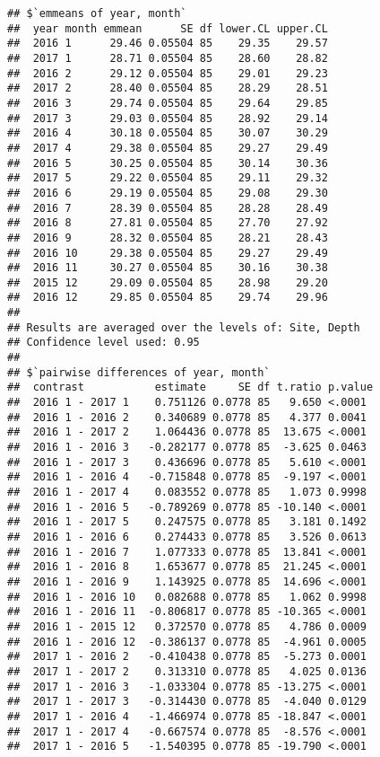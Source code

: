 \documentclass[
]{article}
\begin{document}
\begin{verbatim}
## $`emmeans of year, month`
##  year month emmean      SE df lower.CL upper.CL
##  2016 1      29.46 0.05504 85    29.35    29.57
##  2017 1      28.71 0.05504 85    28.60    28.82
##  2016 2      29.12 0.05504 85    29.01    29.23
##  2017 2      28.40 0.05504 85    28.29    28.51
##  2016 3      29.74 0.05504 85    29.64    29.85
##  2017 3      29.03 0.05504 85    28.92    29.14
##  2016 4      30.18 0.05504 85    30.07    30.29
##  2017 4      29.38 0.05504 85    29.27    29.49
##  2016 5      30.25 0.05504 85    30.14    30.36
##  2017 5      29.22 0.05504 85    29.11    29.32
##  2016 6      29.19 0.05504 85    29.08    29.30
##  2016 7      28.39 0.05504 85    28.28    28.49
##  2016 8      27.81 0.05504 85    27.70    27.92
##  2016 9      28.32 0.05504 85    28.21    28.43
##  2016 10     29.38 0.05504 85    29.27    29.49
##  2016 11     30.27 0.05504 85    30.16    30.38
##  2015 12     29.09 0.05504 85    28.98    29.20
##  2016 12     29.85 0.05504 85    29.74    29.96
## 
## Results are averaged over the levels of: Site, Depth 
## Confidence level used: 0.95 
## 
## $`pairwise differences of year, month`
##  contrast           estimate     SE df t.ratio p.value
##  2016 1 - 2017 1    0.751126 0.0778 85   9.650 <.0001 
##  2016 1 - 2016 2    0.340689 0.0778 85   4.377 0.0041 
##  2016 1 - 2017 2    1.064436 0.0778 85  13.675 <.0001 
##  2016 1 - 2016 3   -0.282177 0.0778 85  -3.625 0.0463 
##  2016 1 - 2017 3    0.436696 0.0778 85   5.610 <.0001 
##  2016 1 - 2016 4   -0.715848 0.0778 85  -9.197 <.0001 
##  2016 1 - 2017 4    0.083552 0.0778 85   1.073 0.9998 
##  2016 1 - 2016 5   -0.789269 0.0778 85 -10.140 <.0001 
##  2016 1 - 2017 5    0.247575 0.0778 85   3.181 0.1492 
##  2016 1 - 2016 6    0.274433 0.0778 85   3.526 0.0613 
##  2016 1 - 2016 7    1.077333 0.0778 85  13.841 <.0001 
##  2016 1 - 2016 8    1.653677 0.0778 85  21.245 <.0001 
##  2016 1 - 2016 9    1.143925 0.0778 85  14.696 <.0001 
##  2016 1 - 2016 10   0.082688 0.0778 85   1.062 0.9998 
##  2016 1 - 2016 11  -0.806817 0.0778 85 -10.365 <.0001 
##  2016 1 - 2015 12   0.372570 0.0778 85   4.786 0.0009 
##  2016 1 - 2016 12  -0.386137 0.0778 85  -4.961 0.0005 
##  2017 1 - 2016 2   -0.410438 0.0778 85  -5.273 0.0001 
##  2017 1 - 2017 2    0.313310 0.0778 85   4.025 0.0136 
##  2017 1 - 2016 3   -1.033304 0.0778 85 -13.275 <.0001 
##  2017 1 - 2017 3   -0.314430 0.0778 85  -4.040 0.0129 
##  2017 1 - 2016 4   -1.466974 0.0778 85 -18.847 <.0001 
##  2017 1 - 2017 4   -0.667574 0.0778 85  -8.576 <.0001 
##  2017 1 - 2016 5   -1.540395 0.0778 85 -19.790 <.0001 

\end{verbatim}
\end{document}

